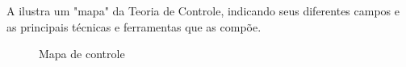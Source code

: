 
A  ilustra um "mapa" da Teoria de Controle, indicando seus diferentes campos e as principais técnicas e ferramentas que as compõe. 
%


\begin{figure}[H]
    \centering
    \caption{Mapa de controle}
    \label{fig:f9k3d8}
\end{figure}
